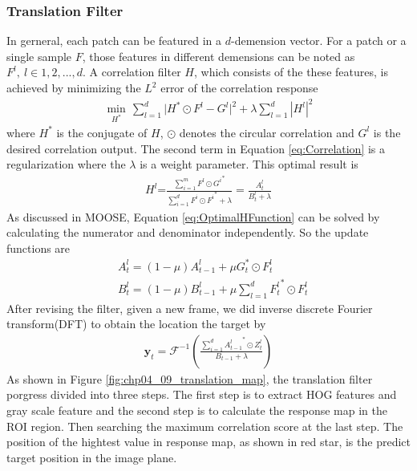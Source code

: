 \documentclass[journal,article,submit,moreauthors,pdftex,10pt,a4paper]{mdpi}
\begin{document}
\subsubsection{Translation Filter}
In gerneral, each patch can be featured in a $d$-demension vector. For a patch or a single sample $F$, those features in different demensions can be noted as $F^l,\ l \in {1, 2, ..., d}$. A correlation filter $H$, which consists of the these features, is achieved by minimizing the $L^2$ error of the correlation response
\begin{align}
\label{eq:Correlation}
	\underset{{{H}^{*}}}{\mathop{\min }}\,\sum\limits_{l=1}^{d}{|{{H}^{*}}\odot{{F}^{l}}-{{G}^{l}}{{|}^{2}}}+\lambda \sum_{l=1}^{d}|H^{l}|^2
\end{align}
where ${H}^{*}$ is the conjugate of $H$, $\odot$ denotes the circular correlation and $G^l$ is the desired correlation output. The second term in Equation \ref{eq:Correlation} is a regularization where the $\lambda$ is a weight parameter. This optimal result is
\begin{align}
\label{eq:OptimalHFunction}
H^l\text{=}\frac{\sum\limits_{i=1}^{m}{{{F}^{l}}\odot {G^{i}}^{{*}}}}{\sum\limits_{i=1}^{d}{{{F}^{i}}\odot {F^{i}}^{\text{*}}}+\lambda}=\frac{A^{l}_{t}}{B^{l}_{t}+\lambda}
\end{align}
As discussed in MOOSE, Equation \ref{eq:OptimalHFunction} can be solved by calculating the numerator and denominator independently. So the update functions are
\begin{align}
\label{eq:moose_at_update}
&A_t^l=(1-\mu)A_{t-1}^{l}+\mu G_{t}^{*}\odot F_{t}^{l}\\
&B_t^l=(1-\mu)B_{t-1}^{l}+\mu \sum_{l=1}^{d}{F_{t}^{l}}^{*}\odot F_{t}^{l}
\end{align}
After revising the filter, given a new frame, we did inverse discrete Fourier transform(DFT) to obtain the location the target by 
 \begin{align}
 \mathbf{y}_t=\mathcal{F}^{-1}(\frac{\sum_{i=1}^{d}{A^{l}_{t-1}}^*\odot Z^{l}_{t}}{B_{t-1}+\lambda})
 \end{align}
As shown in Figure \ref{fig:chp04_09_translation_map}, the translation filter porgress divided into three steps. The first step is to extract HOG features and gray scale feature and the second step is to calculate the response map in the ROI region. Then searching the maximum correlation score at the last step. The position of the hightest value in response map, as shown in red star, is the predict target position in the image plane.
\end{document}
